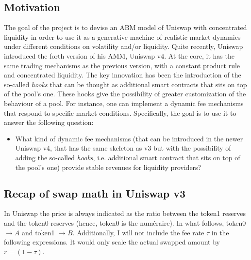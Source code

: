 \documentclass[a4paper,11pt]{article}
\begin{document}
\subsection{Motivation}
The goal of the project is to devise an ABM model of Uniswap with concentrated liquidity in order to use it as a generative machine of realistic market dynamics under different conditions on volatility and/or liquidity. Quite recently, Uniswap introduced the forth version of his AMM, Uniswap v4. At the core, it has the same trading mechanisms as the previous version, with a constant product rule and concentrated liquidity. The key innovation has been the introduction of the so-called \textit{hooks} that can be thought as additional smart contracts that sits on top of the pool's one. These hooks give the possibility of greater customization of the behaviour of a pool. For instance, one can implement a dynamic fee mechanisms that respond to specific market conditions. Specifically, the goal is to use it to answer the following question:
\begin{itemize}
    \item What kind of dynamic fee mechanisms (that can be introduced in the newer Uniswap v4, that has the same skeleton as v3 but with the possibility of adding the so-called \textit{hooks}, i.e. additional smart contract that sits on top of the pool's one) provide stable revenues for liquidity providers?
\end{itemize}

\subsection{Recap of swap math in Uniswap v3}
In Uniswap the price is always indicated as the ratio between the token1 reserves and the token0 reserves (hence, token0 is the numéraire). In what follows, token0 $\to A$ and token1 $\to B$. Additionally, I will not include the fee rate $\tau$ in the following expressions. It would only scale the actual swapped amount by $r=(1-\tau)$.
\end{document}
